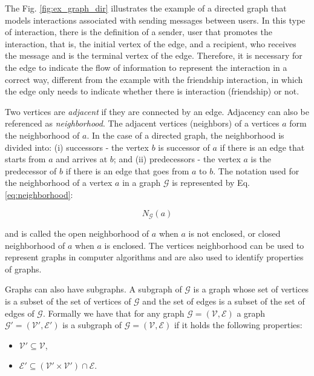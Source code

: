 The Fig. \ref{fig:ex_graph_dir} illustrates the example of a directed graph that models interactions associated with sending messages between users. In this type of interaction, there is the definition of a sender, user that promotes the interaction, that is, the initial vertex of the edge, and a recipient, who receives the message and is the terminal vertex of the edge. Therefore, it is necessary for the edge to indicate the flow of information to represent the interaction in a correct way, different from the example with the friendship interaction, in which the edge only needs to indicate whether there is interaction (friendship) or not.

Two vertices are {\em adjacent} if they are connected by an edge. Adjacency can also be referenced as {\em neighborhood}. The adjacent vertices (neighbors) of a vertices $a$ form the neighborhood of $a$. In the case of a directed graph, the neighborhood is divided into: (i) successors - the vertex $b$ is successor of $a$ if there is an edge that starts from $a$ and arrives at $b$; and (ii) predecessors - the vertex $a$ is the predecessor of $b$ if there is an edge that goes from $a$ to $b$. The notation used for the neighborhood of a vertex $a$ in a graph $\mathcal{G}$ is represented by Eq. \ref{eq:neighborhood}:


\begin{equation} 
    \label{eq:neighborhood}
    N_\mathcal{G}(a)
\end{equation}

and is called the open neighborhood of $a$ when $a$ is not enclosed, or closed neighborhood of $a$ when $a$ is enclosed. The vertices neighborhood can be used to represent graphs in computer algorithms and are also used to identify properties of graphs.

Graphs can also have subgraphs. A subgraph of $\mathcal{G}$ is a graph whose set of vertices is a subset of the set of vertices of $\mathcal{G}$ and the set of edges is a subset of the set of edges of $\mathcal{G}$. Formally we have that for any graph $\mathcal{G}=(\mathcal{V},\mathcal{E})$ a graph  $\mathcal{G'}=(\mathcal{V'},\mathcal{E'})$ is a subgraph of  $\mathcal{G}=(\mathcal{V},\mathcal{E})$ if it holds the following properties:

\begin{itemize}
    \item $\mathcal{V'} \subseteq \mathcal{V}$,
    \item $\mathcal{E'} \subseteq (\mathcal{V'} \times \mathcal{V'}) \cap \mathcal{E}$.
\end{itemize}

